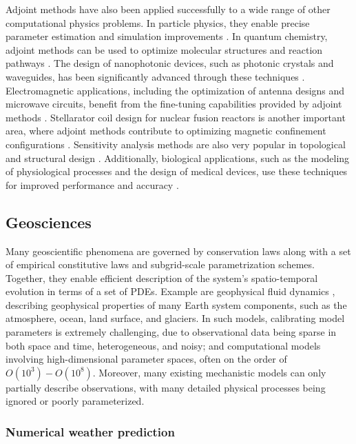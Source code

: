 Adjoint methods have also been applied successfully to a wide range of other computational physics problems. 
In particle physics, they enable precise parameter estimation and simulation improvements \cite{Dorigo.2022}.
In quantum chemistry, adjoint methods can be used to optimize molecular structures and reaction pathways \cite{Arrazola.2021}. 
The design of nanophotonic devices, such as photonic crystals and waveguides, has been significantly advanced through these techniques \cite{Molesky_Lin_Piggott_Jin_Vucković_Rodriguez_2018}. 
Electromagnetic applications, including the optimization of antenna designs and microwave circuits, benefit from the fine-tuning capabilities provided by adjoint methods \cite{Georgieva_Glavic_Bakr_Bandler_2002}. 
Stellarator coil design for nuclear fusion reactors is another important area, where adjoint methods contribute to optimizing magnetic confinement configurations \cite{McGreivy_stellarator_2021}.
Sensitivity analysis methods are also very popular in topological and structural design \cite{min1999optimal, van2005review}.
Additionally, biological applications, such as the modeling of physiological processes and the design of medical devices, use these techniques for improved performance and accuracy \cite{Strouwen2022}.


\subsection{Geosciences}

Many geoscientific phenomena are governed by conservation laws along with a set of empirical constitutive laws and subgrid-scale parametrization schemes. 
Together, they enable efficient description of the system's spatio-temporal evolution in terms of a set of PDEs.
Example are geophysical fluid dynamics \cite{Vallis:2016kv}, describing geophysical properties of many Earth system components, such as the atmosphere, ocean, land surface, and glaciers.
In such models, calibrating model parameters is extremely challenging, due to observational data being sparse in both space and time, heterogeneous, and noisy; and computational models involving high-dimensional parameter spaces, often on the order of $O(10^3) - O(10^8)$.
Moreover, many existing mechanistic models can only partially describe observations, with many detailed physical processes being ignored or poorly parameterized. 


\subsubsection{Numerical weather prediction}
\label{section:meteorlogy}

